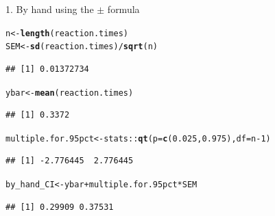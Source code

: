 \documentclass[10pt,handout]{beamer}\usepackage[]{graphicx}\usepackage[]{color}
\makeatletter
\newcommand{\hlnum}[1]{\textcolor[rgb]{0.686,0.059,0.569}{#1}}%
\newcommand{\hlopt}[1]{\textcolor[rgb]{0,0,0}{#1}}%
\newcommand{\hlstd}[1]{\textcolor[rgb]{0.345,0.345,0.345}{#1}}%
\newcommand{\hlkwb}[1]{\textcolor[rgb]{0.69,0.353,0.396}{#1}}%
\newcommand{\hlkwc}[1]{\textcolor[rgb]{0.333,0.667,0.333}{#1}}%
\newcommand{\hlkwd}[1]{\textcolor[rgb]{0.737,0.353,0.396}{\textbf{#1}}}%
\newenvironment{kframe}{%
 \def\at@end@of@kframe{}%
 \ifinner\ifhmode%
  \def\at@end@of@kframe{\end{minipage}}%
  \begin{minipage}{\columnwidth}%
 \fi\fi%
 \def\FrameCommand##1{\hskip\@totalleftmargin \hskip-\fboxsep
 \colorbox{shadecolor}{##1}\hskip-\fboxsep
     \hskip-\linewidth \hskip-\@totalleftmargin \hskip\columnwidth}%
 \MakeFramed {\advance\hsize-\width
   \@totalleftmargin\z@ \linewidth\hsize
   \@setminipage}}%
 {\par\unskip\endMakeFramed%
 \at@end@of@kframe}
\newenvironment{knitrout}{}{} %
\makeatother
\begin{document}
\begin{frame}[fragile]{1. By hand using the $\pm$ formula}
\begin{knitrout}\tiny
{}\color{fgcolor}\begin{kframe}
\begin{alltt}
\hlstd{n} \hlkwb{<-} \hlkwd{length}\hlstd{(reaction.times)}
\hlstd{SEM} \hlkwb{<-} \hlkwd{sd}\hlstd{(reaction.times)}\hlopt{/}\hlkwd{sqrt}\hlstd{(n)}
\end{alltt}
\begin{verbatim}
## [1] 0.01372734
\end{verbatim}
\begin{alltt}
\hlstd{ybar} \hlkwb{<-} \hlkwd{mean}\hlstd{(reaction.times)}
\end{alltt}
\begin{verbatim}
## [1] 0.3372
\end{verbatim}
\begin{alltt}
\hlstd{multiple.for.95pct} \hlkwb{<-} \hlstd{stats}\hlopt{::}\hlkwd{qt}\hlstd{(}\hlkwc{p} \hlstd{=} \hlkwd{c}\hlstd{(}\hlnum{0.025}\hlstd{,} \hlnum{0.975}\hlstd{),} \hlkwc{df} \hlstd{= n}\hlopt{-}\hlnum{1}\hlstd{)}
\end{alltt}
\begin{verbatim}
## [1] -2.776445  2.776445
\end{verbatim}
\begin{alltt}
\hlstd{by_hand_CI} \hlkwb{<-} \hlstd{ybar} \hlopt{+} \hlstd{multiple.for.95pct} \hlopt{*} \hlstd{SEM}
\end{alltt}
\begin{verbatim}
## [1] 0.29909 0.37531
\end{verbatim}
\end{kframe}
\end{knitrout}
\end{frame}
\end{document}
